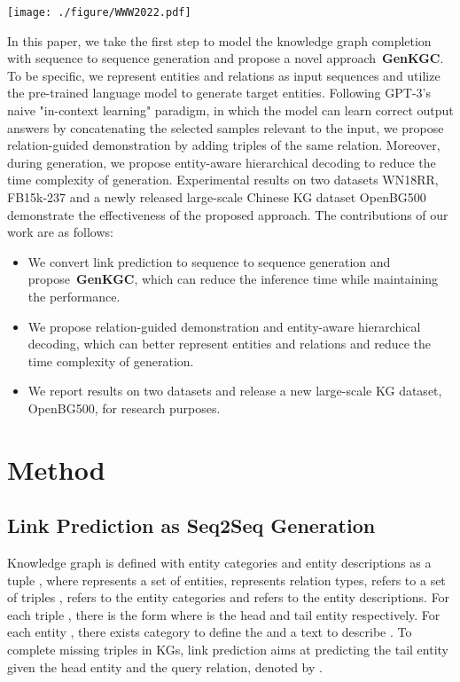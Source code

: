 \documentclass[sigconf]{acmart}
\newcommand{\ours}{\textbf{GenKGC}}
\begin{document}
\begin{figure*}[!t] \centering \texttt{[image: ./figure/WWW2022.pdf]} \caption{
Architecture of \ours. We augment the input text of entity and relation with  demonstrations, and introduce entity-aware hierarchical decoding for fast inference.}
\label{fig:model}
\end{figure*}

 
In this paper, we take the first step to model the knowledge graph completion with sequence to sequence generation and propose a novel approach~\ours.
To be specific, we represent entities and relations as input sequences and utilize the pre-trained language model to generate target entities.
Following GPT-3's naive "in-context learning" paradigm, in which the model can learn correct output answers by concatenating the selected samples relevant to the input, we propose relation-guided demonstration by adding triples of the same relation.
Moreover, during generation, we propose entity-aware hierarchical decoding to reduce the time complexity of generation.
Experimental results on two datasets WN18RR, FB15k-237 and a newly released large-scale Chinese KG dataset OpenBG500 demonstrate the effectiveness of the proposed approach.
The contributions of our work are as follows:

\begin{itemize}
    \item We convert link prediction to sequence to sequence generation and propose~\ours, which can reduce the inference time while maintaining the performance.
    \item We propose relation-guided demonstration and entity-aware hierarchical decoding, which can better represent entities and relations and reduce the time complexity of generation.
    \item We report results on two datasets and release a new large-scale KG dataset, OpenBG500, for research purposes.
\end{itemize}



\section{Method}


\subsection{Link Prediction as Seq2Seq Generation}

Knowledge graph is defined with entity categories and entity descriptions as a tuple , where  represents a set of entities,  represents relation types,  refers to a set of triples ,  refers to the entity categories and  refers to the entity descriptions. 
For each triple , there is the form  where  is the head and tail entity respectively. 
For each entity , there exists category  to define the  and a text  to describe .
To complete missing triples in KGs, link prediction aims at predicting the tail entity given the head entity and the query relation, denoted by .
\end{document}
